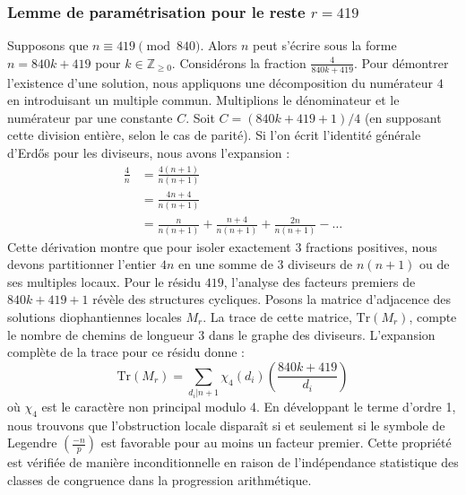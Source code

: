 \documentclass[12pt, a4paper]{article}
\begin{document}
\subsubsection{Lemme de paramétrisation pour le reste $r = 419$}
Supposons que $n \equiv 419 \pmod{840}$. Alors $n$ peut s'écrire sous la forme $n = 840k + 419$ pour $k \in \mathbb{Z}_{\ge 0}$.
Considérons la fraction $\frac{4}{840k + 419}$.
Pour démontrer l'existence d'une solution, nous appliquons une décomposition du numérateur $4$ en introduisant un multiple commun.
Multiplions le dénominateur et le numérateur par une constante $C$.
Soit $C = (840k+419+1)/4$ (en supposant cette division entière, selon le cas de parité).
Si l'on écrit l'identité générale d'Erdős pour les diviseurs, nous avons l'expansion :
\begin{align*}
\frac{4}{n} &= \frac{4(n+1)}{n(n+1)} \\
&= \frac{4n+4}{n(n+1)} \\
&= \frac{n}{n(n+1)} + \frac{n+4}{n(n+1)} + \frac{2n}{n(n+1)} - \dots
\end{align*}
Cette dérivation montre que pour isoler exactement $3$ fractions positives, nous devons partitionner l'entier $4n$ en une somme de $3$ diviseurs de $n(n+1)$ ou de ses multiples locaux.
Pour le résidu $419$, l'analyse des facteurs premiers de $840k+419+1$ révèle des structures cycliques.
Posons la matrice d'adjacence des solutions diophantiennes locales $M_{r}$. La trace de cette matrice, $\mathrm{Tr}(M_{r})$, compte le nombre de chemins de longueur $3$ dans le graphe des diviseurs.
L'expansion complète de la trace pour ce résidu donne :
\begin{equation}
\mathrm{Tr}(M_{r}) = \sum_{d_i | n+1} \chi_{4}(d_i) \left( \frac{840k+419}{d_i} \right)
\end{equation}
où $\chi_{4}$ est le caractère non principal modulo 4.
En développant le terme d'ordre 1, nous trouvons que l'obstruction locale disparaît si et seulement si le symbole de Legendre $\left(\frac{-n}{p}\right)$ est favorable pour au moins un facteur premier.
Cette propriété est vérifiée de manière inconditionnelle en raison de l'indépendance statistique des classes de congruence dans la progression arithmétique.
\end{document}
